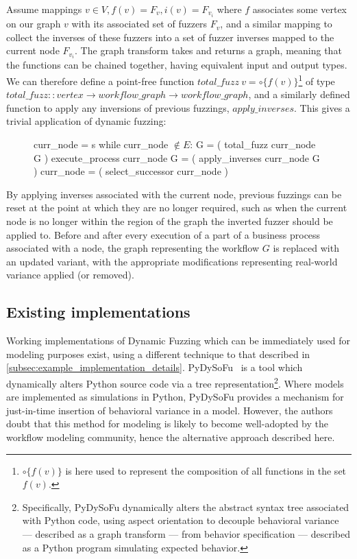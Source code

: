 \documentclass[draft,12pt]{llncs}  %
\begin{document}
Assume mappings \(v \in V, f(v)=F_v, i(v)=F_{v_i}\) where $f$ associates some
vertex on our graph $v$ with its associated set of fuzzers $F_v$, and a similar
mapping to collect the inverses of these fuzzers into a set of fuzzer inverses
mapped to the current node $F_{v_i}$. The graph transform takes and returns a
graph, meaning that the functions can be chained together, having equivalent
input and output types. We can therefore define a point-free function
$total\_fuzz~v = \circ\{f(v)\}$\footnote{$\circ\{f(v)\}$ is here used to
  represent the composition of all functions in the set $f(v)$.} of type
$total\_fuzz :: vertex \rightarrow workflow\_graph \rightarrow workflow\_graph$,
and a similarly defined function to apply any inversions of previous fuzzings,
$apply\_inverses$. This gives a trivial application of dynamic fuzzing:

\begin{figure}[H]
  \begin{algorithm}
    curr_node = s
    while curr_node $\notin{} E$:
        G = ( total_fuzz curr_node G )
        execute_process
        curr_node G = ( apply_inverses curr_node G )
        curr_node = ( select_successor curr_node )
  \end{algorithm}
\end{figure}
By applying inverses associated with the current node, previous fuzzings can be
reset at the point at which they are no longer required, such as when the
current node is no longer within the region of the graph the inverted fuzzer
should be applied to. Before and after every execution of a part of a business
process associated with a node, the graph representing the workflow $G$ is
replaced with an updated variant, with the appropriate modifications
representing real-world variance applied (or removed).
\par

\subsection{Existing implementations}
Working implementations of Dynamic Fuzzing which can be immediately used for
modeling purposes exist, using a different technique to that described in
\cref{subsec:example_implementation_details}. PyDySoFu~\citep{pdsf} is a tool
which dynamically alters Python source code via a tree
representation\footnote{Specifically, PyDySoFu dynamically alters the abstract
  syntax tree associated with Python code, using aspect orientation to decouple
  behavioral variance --- described as a graph transform --- from behavior
  specification --- described as a Python program simulating expected
  behavior.}. Where models are implemented as simulations in Python, PyDySoFu
provides a mechanism for just-in-time insertion of behavioral variance in a
model. However, the authors doubt that this method for modeling is likely to
become well-adopted by the workflow modeling community, hence the alternative
approach described here.
\par
\end{document}
